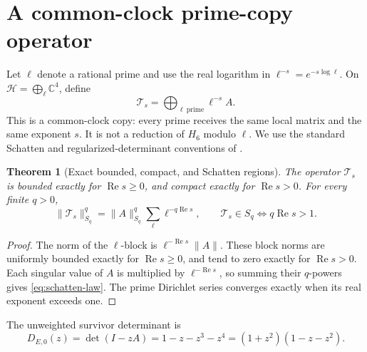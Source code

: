 \documentclass[11pt]{article}
\numberwithin{equation}{section}
\newtheorem{theorem}{Theorem}[section]
\theoremstyle{remark}
\newcommand{\C}{\mathbb C}
\newcommand{\RePart}{\operatorname{Re}}
\newcommand{\cT}{\mathcal T}
\begin{document}
\section{A common-clock prime-copy operator}

Let \(\ell\) denote a rational prime and use the real logarithm in
\(\ell^{-s}=e^{-s\log\ell}\).  On
\(
\mathcal H=\bigoplus_{\ell}\C^4
\), define
\begin{equation}
 \cT_s=\bigoplus_{\ell\ \mathrm{prime}}\ell^{-s}A.
 \label{eq:prime-copy-operator}
\end{equation}
This is a common-clock copy: every prime receives the same local matrix and
the same exponent \(s\).  It is not a reduction of \(H_6\) modulo \(\ell\).
We use the standard Schatten and regularized-determinant conventions of
\citet{Simon2005}.

\begin{theorem}[Exact bounded, compact, and Schatten regions]
\label{thm:schatten}
The operator \(\cT_s\) is bounded exactly for \(\RePart s\ge0\), and compact
exactly for \(\RePart s>0\).  For every finite \(q>0\),
\begin{equation}
 \|\cT_s\|_{S_q}^q
 =\|A\|_{S_q}^q\sum_{\ell}\ell^{-q\RePart s},
 \qquad
 \cT_s\in S_q\Longleftrightarrow q\RePart s>1.
 \label{eq:schatten-law}
\end{equation}
\end{theorem}

\begin{proof}
The norm of the \(\ell\)-block is
\(
\ell^{-\RePart s}\|A\|
\).  These block norms are uniformly bounded exactly for
\(\RePart s\ge0\), and tend to zero exactly for \(\RePart s>0\).  Each
singular value of \(A\) is multiplied by \(\ell^{-\RePart s}\), so summing
their \(q\)-powers gives \eqref{eq:schatten-law}.  The prime Dirichlet series
converges exactly when its real exponent exceeds one.
\end{proof}

The unweighted survivor determinant is
\begin{equation}
 D_{E,0}(z)=\det(I-zA)=1-z-z^3-z^4
 =(1+z^2)(1-z-z^2).
 \label{eq:unweighted-polynomial}
\end{equation}
\end{document}
